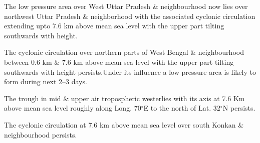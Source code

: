 \item The low pressure area over West Uttar Pradesh \& neighbourhood now lies over northwest Uttar Pradesh \& neighborhood with the associated cyclonic circulation extending upto 7.6 km above mean sea level with the upper part tilting southwards with height.
\item The cyclonic circulation over northern parts of West Bengal \& neighbourhood between 0.6 km \& 7.6 km above mean sea level with the upper part tilting southwards with height persists.Under its influence a low pressure area is likely to form during next 2--3 days.
\item The trough in mid \& upper air tropospheric westerlies with its axis at 7.6 Km above mean sea level roughly along Long. 70$^\circ$E to the north of Lat. 32$^\circ$N persists.
\item The cyclonic circulation at 7.6 km above mean sea level over south Konkan \& neighbourhood persists.